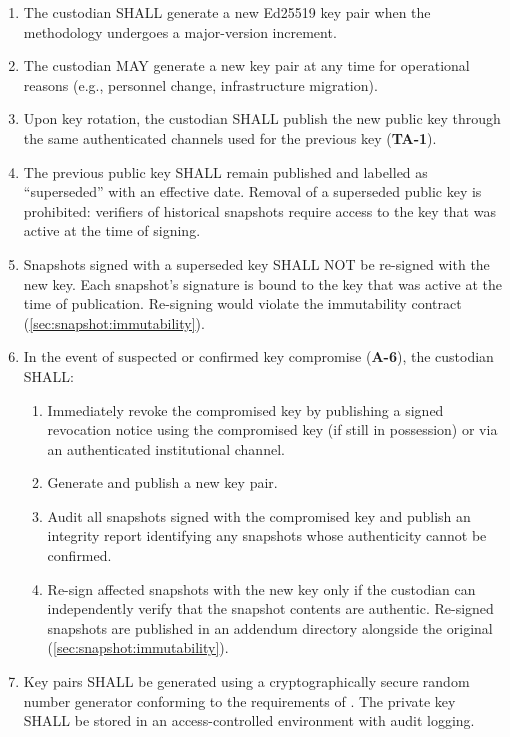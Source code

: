 \begin{enumerate}
  \item The custodian SHALL generate a new Ed25519 key pair when the
    methodology undergoes a major-version increment.

  \item The custodian MAY generate a new key pair at any time for
    operational reasons (e.g., personnel change, infrastructure migration).

  \item Upon key rotation, the custodian SHALL publish the new public key
    through the same authenticated channels used for the previous key
    (\textbf{TA-1}).

  \item The previous public key SHALL remain published and labelled as
    ``superseded'' with an effective date.  Removal of a superseded public
    key is prohibited: verifiers of historical snapshots require access to
    the key that was active at the time of signing.

  \item Snapshots signed with a superseded key SHALL NOT be re-signed with
    the new key.  Each snapshot's signature is bound to the key that was
    active at the time of publication.  Re-signing would violate the
    immutability contract (\cref{sec:snapshot:immutability}).

  \item In the event of suspected or confirmed key compromise
    (\textbf{A-6}), the custodian SHALL:
    \begin{enumerate}[label=(\alph*)]
      \item Immediately revoke the compromised key by publishing a signed
        revocation notice using the compromised key (if still in possession)
        or via an authenticated institutional channel.
      \item Generate and publish a new key pair.
      \item Audit all snapshots signed with the compromised key and publish
        an integrity report identifying any snapshots whose authenticity
        cannot be confirmed.
      \item Re-sign affected snapshots with the new key only if the
        custodian can independently verify that the snapshot contents are
        authentic.  Re-signed snapshots are published in an addendum
        directory alongside the original (\cref{sec:snapshot:immutability}).
    \end{enumerate}

  \item Key pairs SHALL be generated using a cryptographically secure
    random number generator conforming to the requirements of
    \citet{rfc8032}.  The private key SHALL be stored in an
    access-controlled environment with audit logging.
\end{enumerate}

